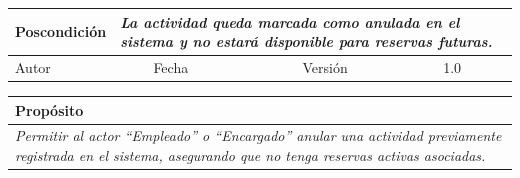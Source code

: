 \begin{table}[H]
\begin{tabular}{llllllll}
        \multicolumn{1}{|l|}{Poscondición}                           & \multicolumn{7}{p{10cm}|}{{\color[HTML]{808080} \textit{La actividad queda marcada como anulada en el sistema y no estará disponible para reservas futuras.}}}                                                                                                                                                                                                                                                       \\ \hline
        \multicolumn{1}{|l|}{Autor}                                  & \multicolumn{1}{l|}{{\color[HTML]{808080} \textit{}}}                           & \multicolumn{2}{l|}{Fecha}                                                   & \multicolumn{1}{l|}{}                          & \multicolumn{2}{l|}{Versión}                                                      & \multicolumn{1}{l|}{1.0}                                                     \\ \hline
        \end{tabular}
    \end{table}

    \begin{table}[H]
        \begin{tabular}{llllllll}
        \hline
        \multicolumn{8}{|l|}{\cellcolor[HTML]{F2F2F2}Propósito}                                                                                                                                                                                                                                                                                                                                                                                           \\ \hline
        \multicolumn{8}{|p{15cm}|}{{\color[HTML]{808080} \textit{Permitir al actor “Empleado” o “Encargado” anular una actividad previamente registrada en el sistema, asegurando que no tenga reservas activas asociadas.}}}                                                                                                                                                                                                             \\ \hline
        \end{tabular}
    \end{table}

